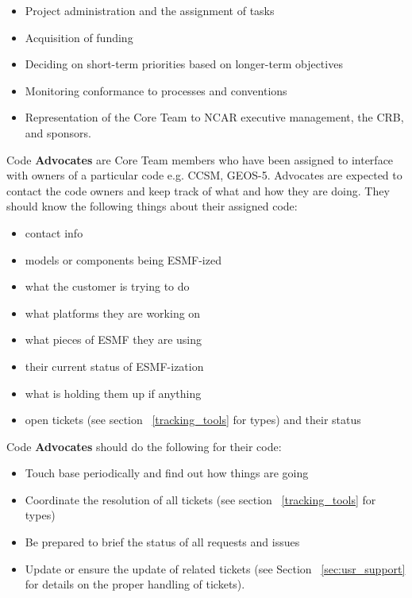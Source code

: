 \begin{itemize}
\item Project administration and the assignment of  tasks
\item Acquisition of funding
\item Deciding on short-term priorities based on longer-term objectives
\item Monitoring conformance to processes and conventions
\item Representation of the Core Team to NCAR executive management, the CRB, and sponsors.
\end{itemize}

Code {\bf Advocates} are Core Team members who have been assigned to interface with owners of
a particular code e.g. CCSM, GEOS-5. Advocates are expected to contact the code owners and keep track of what and how they are doing. They should know the following things about their assigned code:

\begin{itemize}
\item contact info
\item models or components being ESMF-ized
\item what the customer is trying to do
\item what platforms they are working on
\item what pieces of ESMF they are using
\item their current status of ESMF-ization
\item what is holding them up if anything
\item open tickets (see section ~\ref{tracking_tools} for types) and their status
\end{itemize}

Code {\bf Advocates} should do the following for their code:
\begin{itemize}
\item Touch base periodically and find out how things are going
\item Coordinate the resolution of all tickets (see section ~\ref{tracking_tools} for types)
\item Be prepared to brief the status of all requests and issues
\item Update or ensure the update of related tickets (see Section ~\ref{sec:usr_support} for details on
the proper handling of tickets).
\end{itemize}

